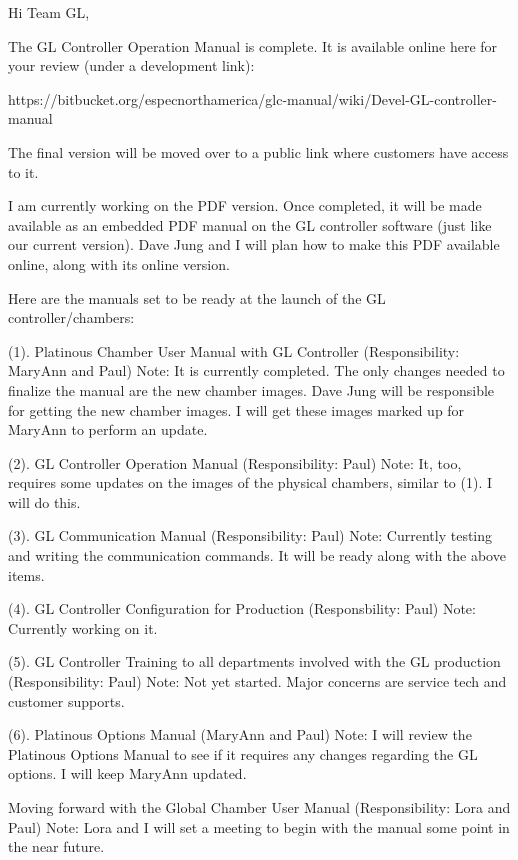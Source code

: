 Hi Team GL,

The GL Controller Operation Manual is complete. It is available online here for your review (under a development link): 

https://bitbucket.org/especnorthamerica/glc-manual/wiki/Devel-GL-controller-manual

The final version will be moved over to a public link where customers have access to it. 

I am currently working on the PDF version. Once completed, it will be made available as an embedded PDF manual on the GL controller software (just like our current version). Dave Jung and I will plan how to make this PDF available online, along with its online version. 

Here are the manuals set to be ready at the launch of the GL controller/chambers: 

(1). Platinous Chamber User Manual with GL Controller (Responsibility: MaryAnn and Paul)
Note: It is currently completed. The only changes needed to finalize the manual are the new chamber images. Dave Jung will be responsible for getting the new chamber images. I will get these images marked up for MaryAnn to perform an update. 

(2). GL Controller Operation Manual (Responsibility: Paul)
Note: It, too, requires some updates on the images of the physical chambers, similar to (1). I will do this. 

(3). GL Communication Manual (Responsibility: Paul) 
Note: Currently testing and writing the communication commands. It will be ready along with the above items.  

(4). GL Controller Configuration for Production (Responsbility: Paul) 
Note: Currently working on it. 

(5). GL Controller Training to all departments involved with the GL production (Responsibility: Paul) 
Note: Not yet started. Major concerns are service tech and customer supports. 

(6). Platinous Options Manual (MaryAnn and Paul)
Note: I will review the Platinous Options Manual to see if it requires any changes regarding the GL options. I will keep MaryAnn updated.  

Moving forward with the Global Chamber User Manual (Responsibility: Lora and Paul) 
Note: Lora and I will set a meeting to begin with the manual some point in the near future. 




